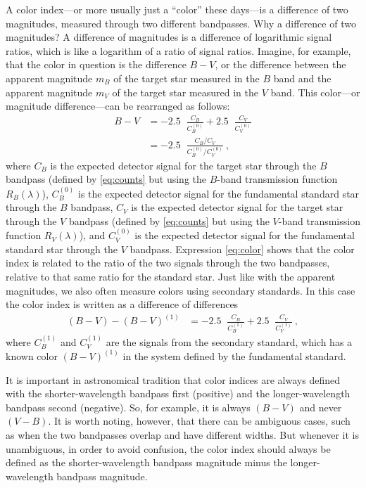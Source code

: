 \documentclass[10pt]{article}
\DeclareMathOperator{\logten}{log_{10}}
\begin{document}
A color index---or more usually just a ``color'' these days---is a difference of two magnitudes, measured through two different bandpasses.
Why a difference of two magnitudes?
A difference of magnitudes is a difference of logarithmic signal ratios, which is like a logarithm of a ratio of signal ratios.
Imagine, for example, that the color in question is the difference $B-V$, or the difference between the apparent magnitude $m_B$ of the target star measured in the $B$ band and the apparent magnitude $m_V$ of the target star measured in the $V$ band.
This color---or magnitude difference---can be rearranged as follows:
\begin{align}
    B-V &= -2.5\logten\frac{C_B}{C^{(0)}_B} + 2.5\logten\frac{C_V}{C^{(0)}_V}\\
        &= -2.5\logten\frac{C_B/C_V}{C^{(0)}_B/C^{(0)}_V}\label{eq:color} ~,
\end{align}
where $C_B$ is the expected detector signal for the target star through the $B$ bandpass (defined by \eqref{eq:counts} but using the $B$-band transmission function $R_B(\lambda)$),
$C^{(0)}_B$ is the expected detector signal for the fundamental standard star through the $B$ bandpass,
$C_V$ is the expected detector signal for the target star through the $V$ bandpass (defined by \eqref{eq:counts} but using the $V$-band transmission function $R_V(\lambda)$), and
$C^{(0)}_V$ is the expected detector signal for the fundamental standard star through the $V$ bandpass.
Expression \eqref{eq:color} shows that the color index is related to the ratio of the two signals through the two bandpasses, relative to that same ratio for the standard star.
Just like with the apparent magnitudes, we also often measure colors using secondary standards.
In this case the color index is written as a difference of differences
\begin{align}
    (B-V) - (B-V)^{(1)} &= -2.5\logten\frac{C_B}{C^{(1)}_B} + 2.5\logten\frac{C_V}{C^{(1)}_V} ~,
\end{align}
where $C^{(1)}_B$ and $C^{(1)}_V$ are the signals from the secondary standard, which has a known color $(B-V)^{(1)}$ in the system defined by the fundamental standard.

It is important in astronomical tradition that color indices are always defined with the shorter-wavelength bandpass first (positive) and the longer-wavelength bandpass second (negative).
So, for example, it is always $(B-V)$ and never $(V-B)$.
It is worth noting, however, that there can be ambiguous cases, such as when the two bandpasses overlap and have different widths.
But whenever it is unambiguous, in order to avoid confusion, the color index should always be defined as the shorter-wavelength bandpass magnitude minus the longer-wavelength bandpass magnitude.
\end{document}
